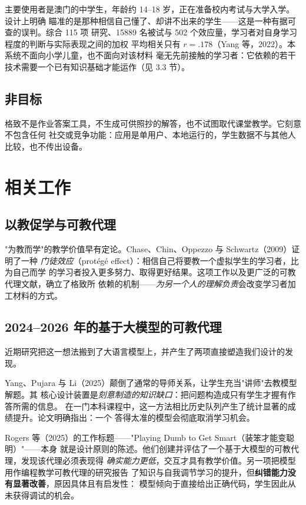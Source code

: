 \documentclass[11pt,a4paper,UTF8,fontset=windows]{ctexart}
\begin{document}
主要使用者是澳门的中学生，年龄约 14--18 岁，正在准备校内考试与大学入学。设计上明确
瞄准的是那种相信自己懂了、却讲不出来的学生——这是一种有据可查的误判。综合 115 项
研究、15889 名被试与 502 个效应量，学习者对自身学习程度的判断与实际表现之间的加权
平均相关只有 \(r = .178\)（Yang 等，2022）。本系统不面向小学儿童，也不面向对该材料
毫无先前接触的学习者：它依赖的若干技术需要一个已有知识基础才能运作（见 3.3 节）。

\subsection{非目标}

格致不是作业答案工具，不生成可供照抄的解答，也不试图取代课堂教学。它刻意不包含任何
社交或竞争功能：应用是单用户、本地运行的，学生数据不与其他人比较，也不传出设备。

\section{相关工作}

\subsection{以教促学与可教代理}

"为教而学"的教学价值早有定论。Chase、Chin、Oppezzo 与 Schwartz（2009）证明了一种
\emph{门徒效应}（protégé effect）：相信自己将要教一个虚拟学生的学习者，比为自己而学
的学习者投入更多努力、取得更好结果。这项工作以及更广泛的可教代理文献，确立了格致所
依赖的机制——\emph{为另一个人的理解负责}会改变学习者加工材料的方式。

\subsection{2024--2026 年的基于大模型的可教代理}

近期研究把这一想法搬到了大语言模型上，并产生了两项直接塑造我们设计的发现。

Yang、Pujara 与 Li（2025）颠倒了通常的导师关系，让学生充当"讲师"去教模型解题。其
核心设计装置是\emph{刻意制造的知识缺口}：把问题构造成只有学生才握有作答所需的信息。
在一门本科课程中，这一方法相比历史队列产生了统计显著的成绩提升。论文明确指出：一个
答得太准的模型会彻底取消学习机会。

Rogers 等（2025）的工作标题——"Playing Dumb to Get Smart（装笨才能变聪明）"——本身
就是设计原则的陈述。他们创建并评估了一个基于大模型的可教代理，发现该代理必须表现得
\emph{确实能力更低}，交互才具有教学价值。另一项把模型用作编程教学可教代理的研究报告
了知识与自我调节学习的提升，但\textbf{纠错能力没有显著改善}，原因具体且有启发性：
模型倾向于直接给出正确代码，学生因此从未获得调试的机会。
\end{document}
